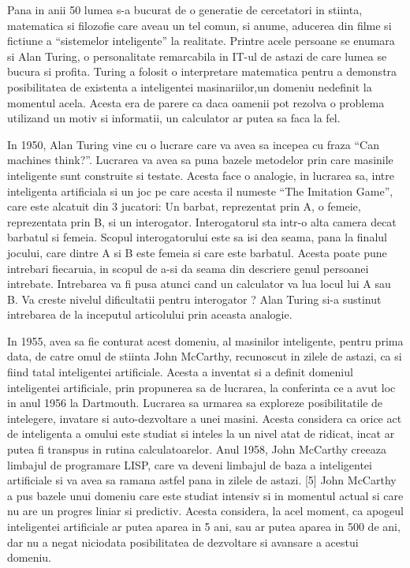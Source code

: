 	Pana in anii 50 lumea s-a bucurat de o generatie de cercetatori in stiinta, matematica si filozofie care aveau un tel comun, si anume, aducerea din filme si fictiune a “sistemelor inteligente” la realitate. Printre acele persoane se enumara si Alan Turing, o personalitate remarcabila in IT-ul de astazi de care lumea se bucura si profita. Turing a folosit o interpretare matematica pentru a demonstra posibilitatea de existenta a inteligentei masinariilor,un domeniu nedefinit la momentul acela. Acesta era de parere ca daca oamenii pot rezolva o problema utilizand un motiv si informatii, un calculator ar putea sa faca la fel. \cite{ai_history}
	
	In 1950, Alan Turing vine cu o lucrare care va avea sa incepea cu fraza “Can machines think?”. Lucrarea va avea sa puna bazele metodelor prin care masinile inteligente sunt construite si testate. Acesta face o analogie, in lucrarea sa, intre inteligenta artificiala si un joc pe care acesta il numeste “The Imitation Game”, care este alcatuit din 3 jucatori: Un barbat, reprezentat prin A, o femeie, reprezentata prin B, si un interogator. Interogatorul sta intr-o alta camera decat barbatul si femeia. Scopul interogatorului este sa isi dea seama, pana la finalul jocului, care dintre A si B este femeia si care este barbatul. Acesta poate pune intrebari fiecaruia, in scopul de a-si da seama din descriere genul persoanei intrebate. Intrebarea va fi pusa atunci cand un calculator va lua locul lui A sau B. Va creste nivelul dificultatii pentru interogator ? Alan Turing si-a sustinut intrebarea de la inceputul  articolului prin aceasta analogie. \cite{turing}
	
	In 1955, avea sa fie conturat acest domeniu, al masinilor inteligente, pentru prima data, de catre omul de stiinta John McCarthy, recunoscut in zilele de astazi, ca si fiind tatal inteligentei artificiale. Acesta a inventat si a definit domeniul inteligentei artificiale, prin propunerea sa de lucrarea, la conferinta ce a avut loc in anul 1956 la Dartmouth. Lucrarea sa urmarea sa exploreze posibilitatile de intelegere, invatare si auto-dezvoltare a unei masini. Acesta considera ca orice act de inteligenta a omului este studiat si  inteles la un nivel atat de ridicat,  incat ar putea fi transpus in rutina calculatoarelor. Anul 1958, John McCarthy creeaza limbajul de programare LISP, care va deveni limbajul de baza a inteligentei artificiale si va avea sa ramana astfel pana in zilele de astazi. [5]
	John McCarthy a pus bazele unui domeniu care este studiat intensiv si in momentul actual si care nu are un progres liniar si predictiv. Acesta considera, la acel moment, ca apogeul inteligentei artificiale ar putea aparea in 5 ani, sau ar putea aparea in 500 de ani, dar nu a negat niciodata posibilitatea de dezvoltare si avansare a acestui domeniu.
	
